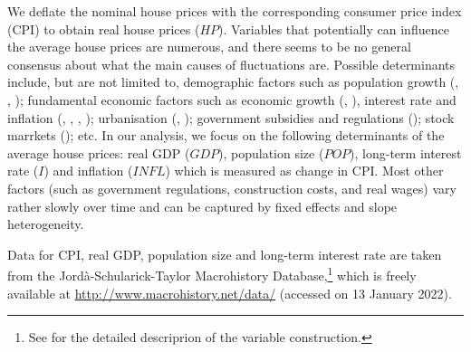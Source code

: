 \documentclass[a4paper,12pt]{article}
\begin{document}
We deflate the nominal house prices with the corresponding consumer price index (CPI) to obtain real house prices ($HP$). Variables that potentially can influence the average house prices are numerous, and there seems to be no general consensus about what the main causes of fluctuations are. Possible determinants include, but are not limited to, demographic factors such as population growth (\citealt{Holly2010}, \citealt{Wang2014}, \citealt{Churchill2021}); fundamental economic factors such as economic growth (\citealt{Huang2013}, \citealt{Churchill2021}), interest rate and inflation (\citealt{Abelson2005}, \citealt{Otto2007}, \citealt{Huang2013}, \citealt{Jorda2015}); urbanisation (\citealt{Chen2011}, \citealt{Wang2017}); government subsidies and regulations (\citealt{Malpezzi1999}); stock marrkets (\citealt{Gallin2006}); etc. In our analysis, we focus on the following determinants of the average house prices: real GDP ($GDP$), population size ($POP$), long-term interest rate ($I$) and inflation ($INFL$) which is measured as change in CPI. Most other factors (such as government regulations, construction costs, and real wages) vary rather slowly over time and can be captured by fixed effects and slope heterogeneity.



Data for CPI, real GDP, population size and long-term interest rate are taken from the Jordà-Schularick-Taylor Macrohistory Database,\footnote{See \cite{Jorda2017} for the detailed descriprion of the variable construction.} which is freely available at \linebreak\url{http://www.macrohistory.net/data/} (accessed on 13 January 2022).
\end{document}
